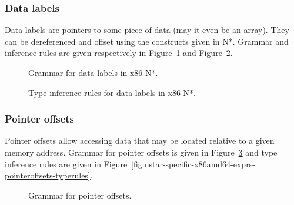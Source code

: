 \subsubsection{Data labels}\label{subsubsec:nstar-specific-x86amd64-exprs-labels}

Data labels are pointers to some piece of data (may it even be an array).
They can be dereferenced and offset using the constructs given in N*.
Grammar and inference rules are given respectively in Figure~\ref{fig:nstar-specific-x86amd64-exprs-labels-grammar} and Figure~\ref{fig:nstar-specific-x86amd64-exprs-labels-typerules}.

\begin{figure}[H]
  \centering

  \caption{Grammar for data labels in x86-N*.}
  \label{fig:nstar-specific-x86amd64-exprs-labels-grammar}
\end{figure}

\begin{figure}[H]
  \centering

  \begin{prooftree}
  \end{prooftree}

  \caption{Type inference rules for data labels in x86-N*.}
  \label{fig:nstar-specific-x86amd64-exprs-labels-typerules}
\end{figure}

\subsubsection{Pointer offsets}\label{fig:nstar-specific-x86amd64-exprs-pointeroffsets}

Pointer offsets allow accessing data that may be located relative to a given memory address.
Grammar for pointer offsets is given in Figure~\ref{fig:nstar-specific-x86amd64-exprs-pointeroffsets-grammar} and type inference rules are given in Figure~\ref{fig:nstar-specific-x86amd64-exprs-pointeroffsets-typerules}.

\begin{figure}[H]
  \centering


  \caption{Grammar for pointer offsets.}
  \label{fig:nstar-specific-x86amd64-exprs-pointeroffsets-grammar}
\end{figure}

